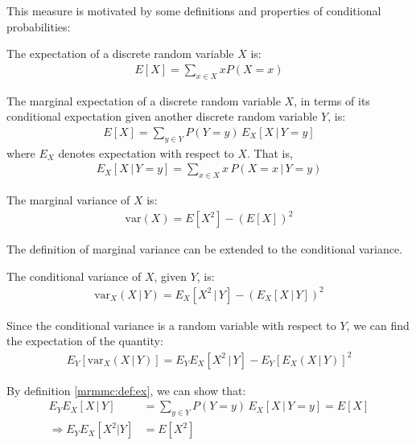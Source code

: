 \documentclass[12pt, twoside, a4paper]{report}
\def\var{\text{var}}
\begin{document}
This measure is motivated by some definitions and properties of conditional probabilities:\\

\begin{mydef}[Expectation]
\label{mrmmc:def:ex}
The expectation of a discrete random variable $X$ is:
\begin{align*}
E[X] = \sum_{x \in X} x P(X=x)
\end{align*}
\end{mydef}

\begin{mydef}
\label{mrmmc:def:margex}
The marginal expectation of a discrete random variable $X$, in terms of its conditional expectation given another discrete random variable $Y$, is:
\begin{align*}
E[X] = \sum_{y \in Y} P(Y=y) \, E_X[X \, | \, Y=y]
\end{align*}
where $E_X$ denotes expectation with respect to $X$. That is,
\begin{align*}
E_X[X \, | \,Y=y] = \sum_{x\in X} x \, P(X=x \, | \, Y=y)
\end{align*}
\end{mydef}

\begin{mydef}
\label{mrmmc:def:margvar}
The marginal variance of $X$ is:
\begin{align*}
\var(X) = E[X^2] - \left( E[X] \right) ^2
\end{align*}
\end{mydef}

The definition of marginal variance can be extended to the conditional variance.\\

\begin{mydef}
The conditional variance of $X$, given $Y$, is:
\begin{align*}
\var_X(X \, | \, Y) = E_X[X^2 \, | \, Y] - \left( E_X[X \, | \, Y] \right)^2
\end{align*}
\end{mydef}

Since the conditional variance is a random variable with respect to $Y$, we can find the expectation of the quantity:
\begin{align}
E_Y [ \var_X(X \, | \, Y) ] = E_YE_X[X^2 \, | \, Y] - E_Y [ E_X(X\,|\,Y) ] ^2 \label{mrmmc:eq:star}
\end{align}

By definition \ref{mrmmc:def:ex}, we can show that:
\begin{align}
E_YE_X[X \, | \, Y] &= \sum_{y \in Y} P(Y=y) \, E_X[X \, | \, Y=y] = E[X] \label{mrmmc:eq:exp1} \\
\Rightarrow E_YE_X[X^2|Y] &= E[X^2] \nonumber
\end{align}
\end{document}
